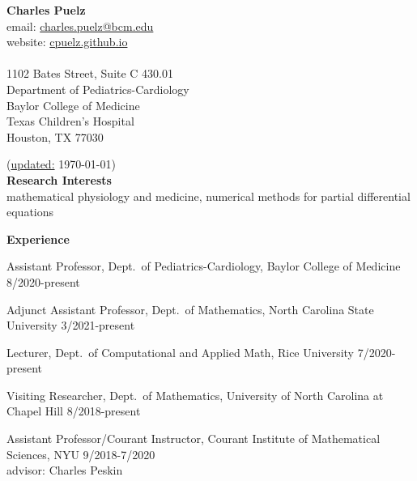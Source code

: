 \documentclass{article} %
\begin{document}
\noindent
{\Large{\bf Charles Puelz}} \\

\noindent
email: \url{charles.puelz@bcm.edu} \\
website: \url{cpuelz.github.io} \\ \\
1102 Bates Street, Suite C 430.01 \\
Department of Pediatrics-Cardiology \\ 
Baylor College of Medicine \\
Texas Children's Hospital \\
Houston, TX 77030

\vspace{0.2cm}
\noindent
{\small (\url{updated:} \today)} \\


\noindent
{\bf \large Research Interests} \\

\indent
mathematical physiology and medicine, numerical methods for partial differential equations

\vspace{0.5cm}
\noindent
{\bf \large Experience}

\vspace{0.25cm}
\indent 
Assistant Professor, Dept.~of Pediatrics-Cardiology, Baylor College of Medicine  \hspace*{\fill} 8/2020-present 

\vspace{0.1cm}

\indent 
Adjunct Assistant Professor, Dept.~of Mathematics, North Carolina State University  \hspace*{\fill} 3/2021-present 

\vspace{0.1cm}
\indent
Lecturer, Dept.~of Computational and Applied Math, Rice University \hspace*{\fill} 7/2020-present 

\vspace{0.1cm}
\indent
Visiting Researcher, Dept.~of Mathematics, University of North Carolina at Chapel Hill \hspace*{\fill} 8/2018-present 

\vspace{0.1cm}
\indent
Assistant Professor/Courant Instructor, Courant Institute of Mathematical Sciences, NYU  \hspace*{\fill} 9/2018-7/2020 \\ 
\indent
advisor: Charles Peskin 
\end{document}
